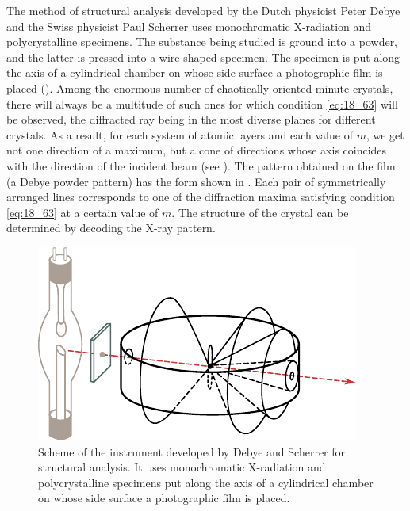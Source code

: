 The method of structural analysis developed by the Dutch physicist Peter Debye and the Swiss physicist Paul Scherrer uses monochromatic X-radiation and polycrystalline specimens.
The substance being studied is ground into a powder, and the latter is pressed into a wire-shaped specimen.
The specimen is put along the axis of a cylindrical chamber on whose side surface a photographic film is placed ().
Among the enormous number of chaotically oriented minute crystals, there will always be a multitude of such ones for which condition \eqref{eq:18_63} will be observed, the diffracted ray being in the most diverse planes for different crystals.
As a result, for each system of atomic layers and each value of $m$, we get not one direction of a maximum, but a cone of directions whose axis
coincides with the direction of the incident beam (see ).
The pattern obtained on the film (a Debye powder pattern) has the form shown in .
Each pair of symmetrically arranged lines corresponds to one of the diffraction maxima satisfying condition \eqref{eq:18_63} at a certain value of $m$.
The structure of the crystal can be determined by decoding the X-ray pattern.

\begin{figure}[!htb]
	\begin{center}
		\includegraphics[scale=1.0]{figures/ch_18/fig_18_45.pdf}
        \caption[]{Scheme of the instrument developed by Debye and Scherrer for structural analysis. It uses monochromatic X-radiation and polycrystalline specimens put along the axis of a cylindrical chamber on whose side surface a photographic film is placed.}
		\label{fig:18_45}
	\end{center}
	\vspace{-0.2cm}
\end{figure}


